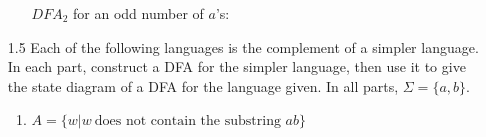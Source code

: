 \begin{enumerate}
\begin{enumerate}
                    $DFA_2$ for an odd number of $a$'s:

                    \begin{figure}[H]
                        \centering
                    \end{figure}
                    
          \end{enumerate}
          
    \item[1.5]
          Each of the following languages is the complement of a simpler language. In each part, construct a DFA for the simpler language, then use it to give the state diagram of a DFA for the language given. In all parts, $\Sigma=\{a,b\}$.
          \begin{enumerate}
              \item $A = \{w|w~\text{does not contain the substring }ab\}$
                    

\end{enumerate}
\end{enumerate}
